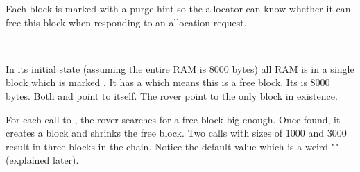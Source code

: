 Each block is marked with a purge hint so the allocator can know whether it can free this block when responding to an allocation request.\\
\par
{}\\
\par
In its initial state (assuming the entire RAM is 8000 bytes) all RAM is in a single block which is marked . It has a   which means this is a free block. Its  is 8000 bytes. Both  and  point to itself. The rover point to the only block in existence.\\
\par
{}
\par
For each call to , the rover searches for a free block big enough. Once found, it creates a block and shrinks the free block. Two calls with sizes of 1000 and 3000 result in three blocks in the chain. Notice the default  value which is a weird "" (explained later).\\
\par
{}

